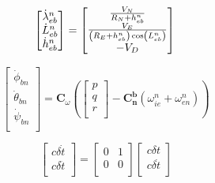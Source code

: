 \begin{equation}\label{eq:posrate}
    \begin{bmatrix}
        \dot{\lambda}_{eb}^n \\
        \dot{L}_{eb}^n       \\
        \dot{h}_{eb}^n       \\
    \end{bmatrix} =
    \begin{bmatrix}
        \frac{V_N}{R_N + h_{eb}^n}                                       \\
        \frac{V_E}{\left(R_E + h_{eb}^n\right)\cos\left(L_{eb}^n\right)} \\
        -V_D                                                             \\
    \end{bmatrix}\\
\end{equation}

\begin{equation}\label{eq:eulerRates}
    \begin{bmatrix}
        \dot{\phi}_{bn}   \\
        \dot{\theta}_{bn} \\
        \dot{\psi}_{bn}   \\
    \end{bmatrix} =
    \mathbf{C}_{\omega}
    \left(
    \begin{bmatrix}
            p \\
            q \\
            r \\
        \end{bmatrix} -
    \mathbf{C_n^b}\left(\omega_{ie}^n + \omega_{en}^n\right)
    \right)
\end{equation}

\begin{equation}\label{eq:clkRates}
    \begin{bmatrix}
        c\delta \dot{t} \\
        c\delta\ddot{t} \\
    \end{bmatrix} =
    \begin{bmatrix}
        0 & 1 \\
        0 & 0 \\
    \end{bmatrix}
    \begin{bmatrix}
        c\delta {t}    \\
        c\delta\dot{t} \\
    \end{bmatrix}
\end{equation}

